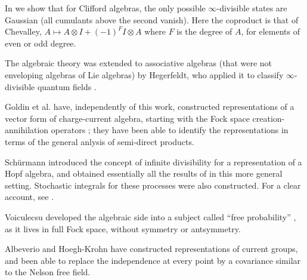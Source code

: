 In \cite{Mathon2} we show that for Clifford algebras, the only possible
$\infty$-divisible states are
Gaussian (all cumulants above the second vanish). Here 
the coproduct is that of Chevalley,
$A\mapsto A\otimes I+(-1)^FI\otimes A$ where $F$ is the
degree of $A$, for elements of even or odd degree.

The algebraic theory
was extended to associative algebras (that were not enveloping
algebras of Lie algebras) by Hegerfeldt, who applied it to classify
$\infty$-divisible quantum fields \cite{Hegerfeldt2}.

Goldin et al. have, independently of this work, constructed
representations of a vector form of charge-current algebra, starting
with the Fock space creation-annihilation operators \cite{Goldin}; they
have been able to identify the representations in terms of the general
anlysis of semi-direct products.

Sch\"{u}rmann \cite{Schurmann} introduced the concept of infinite
divisibility for a representation of a Hopf algebra, and obtained 
essentially all the results of \cite{RFS4,Mathon,Mathon2} in this more
general setting.
Stochastic integrals for these processes were also constructed.
For a clear account, see \cite{Meyer}.

 
Voiculecsu developed the algebraic side into a subject called ``free
probability'' \cite{Voiculescu}, as it lives in full Fock space, without
symmetry or antsymmetry.


Albeverio and Hoegh-Krohn \cite{Albeverio} have constructed
representations of current 
groups, and been able to replace the independence at every point by
a covariance similar to the Nelson free field.

